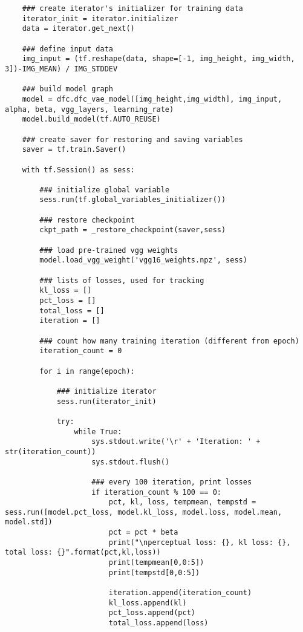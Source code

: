 \begin{footnotesize}
\begin{lstlisting}
    ### create iterator's initializer for training data 
    iterator_init = iterator.initializer
    data = iterator.get_next()
    
    ### define input data
    img_input = (tf.reshape(data, shape=[-1, img_height, img_width, 3])-IMG_MEAN) / IMG_STDDEV
    
    ### build model graph
    model = dfc.dfc_vae_model([img_height,img_width], img_input, alpha, beta, vgg_layers, learning_rate)
    model.build_model(tf.AUTO_REUSE)
    
    ### create saver for restoring and saving variables
    saver = tf.train.Saver()
    
    with tf.Session() as sess:

        ### initialize global variable
        sess.run(tf.global_variables_initializer())
        
        ### restore checkpoint
        ckpt_path = _restore_checkpoint(saver,sess)
        
        ### load pre-trained vgg weights
        model.load_vgg_weight('vgg16_weights.npz', sess)
        
        ### lists of losses, used for tracking
        kl_loss = []
        pct_loss = []
        total_loss = []
        iteration = []
        
        ### count how many training iteration (different from epoch)
        iteration_count = 0
        
        for i in range(epoch):
            
            ### initialize iterator
            sess.run(iterator_init)
            
            try:
                while True:
                    sys.stdout.write('\r' + 'Iteration: ' + str(iteration_count))
                    sys.stdout.flush()
                    
                    ### every 100 iteration, print losses 
                    if iteration_count % 100 == 0:
                        pct, kl, loss, tempmean, tempstd = sess.run([model.pct_loss, model.kl_loss, model.loss, model.mean, model.std])
                        pct = pct * beta
                        print("\nperceptual loss: {}, kl loss: {}, total loss: {}".format(pct,kl,loss))
                        print(tempmean[0,0:5])
                        print(tempstd[0,0:5])
                        
                        iteration.append(iteration_count)
                        kl_loss.append(kl)
                        pct_loss.append(pct)
                        total_loss.append(loss)
                    

\end{lstlisting}
\end{footnotesize}
